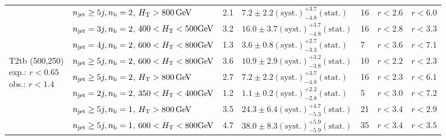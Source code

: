 \begin{table}[h!]
\begin{tabular}{ lllllll }
 & $n_{\mathrm{jet}} \geq5j,n_{\text{b}} =2$, $\mbox{$H_\text{T}$} > 800 \, \mathrm{GeV}$ & 2.1 & $7.2 \pm 2.2 \mathrm{(syst.)} ^{+3.7}_{-4.8} \mathrm{(stat.)}$ & 16 & $r < 2.6$ & $r < 6.0$\\ 
 & $n_{\mathrm{jet}} =3j,n_{\text{b}} =2$, $400 < \mbox{$H_\text{T}$} < 500 \mathrm{GeV}$ & 3.2 & $16.0 \pm 3.7 \mathrm{(syst.)} ^{+3.7}_{-4.8} \mathrm{(stat.)}$ & 16 & $r < 2.8$ & $r < 3.3$\\ 
 & $n_{\mathrm{jet}} =4j,n_{\text{b}} =2$, $600 < \mbox{$H_\text{T}$} < 800 \mathrm{GeV}$ & 1.3 & $3.6 \pm 0.8 \mathrm{(syst.)} ^{+2.7}_{-3.3} \mathrm{(stat.)}$ & 7 & $r < 3.6$ & $r < 7.1$\\ \hline
\multirow{5}{*}{\parbox[t]{2cm}{T2tb (500,250)\\exp.: $r<0.65$\\obs.: $r<1.4$}}
 & $n_{\mathrm{jet}} \geq5j,n_{\text{b}} =2$, $600 < \mbox{$H_\text{T}$} < 800 \mathrm{GeV}$ & 3.6 & $10.9 \pm 2.9 \mathrm{(syst.)} ^{+3.2}_{-3.8} \mathrm{(stat.)}$ & 10 & $r < 2.2$ & $r < 2.3$\\ 
 & $n_{\mathrm{jet}} \geq5j,n_{\text{b}} =2$, $\mbox{$H_\text{T}$} > 800 \, \mathrm{GeV}$ & 2.7 & $7.2 \pm 2.2 \mathrm{(syst.)} ^{+3.7}_{-4.8} \mathrm{(stat.)}$ & 16 & $r < 2.3$ & $r < 6.1$\\ 
 & $n_{\mathrm{jet}} =2j,n_{\text{b}} =2$, $350 < \mbox{$H_\text{T}$} < 400 \mathrm{GeV}$ & 1.2 & $1.1 \pm 0.2 \mathrm{(syst.)} ^{+2.2}_{-2.8} \mathrm{(stat.)}$ & 5 & $r < 3.0$ & $r < 7.2$\\ 
 & $n_{\mathrm{jet}} \geq5j,n_{\text{b}} =1$, $\mbox{$H_\text{T}$} > 800 \, \mathrm{GeV}$ & 3.5 & $24.3 \pm 6.4 \mathrm{(syst.)} ^{+4.7}_{-5.3} \mathrm{(stat.)}$ & 21 & $r < 3.4$ & $r < 2.9$\\ 
 & $n_{\mathrm{jet}} \geq5j,n_{\text{b}} =1$, $600 < \mbox{$H_\text{T}$} < 800 \mathrm{GeV}$ & 4.7 & $38.0 \pm 8.3 \mathrm{(syst.)} ^{+5.9}_{-5.9} \mathrm{(stat.)}$ & 35 & $r < 3.4$ & $r < 3.5$\\ \hline
    \hline
  \end{tabular}
\end{table}
